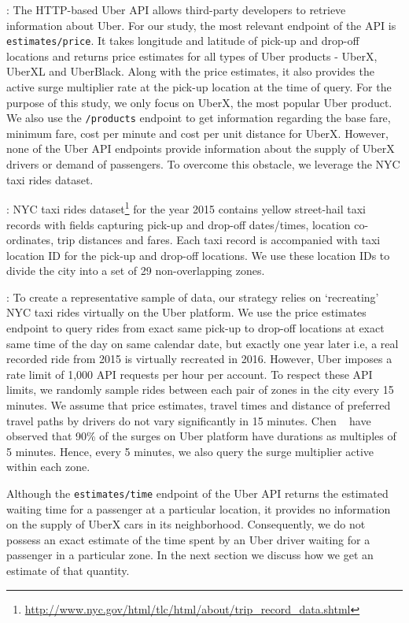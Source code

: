 : 
The HTTP-based Uber API allows third-party developers to retrieve information about Uber. For our study, the most relevant endpoint of the API is \texttt{estimates/price}. It takes longitude and latitude of pick-up and drop-off locations and returns price estimates for all types of Uber products - UberX, UberXL and UberBlack. Along with the price estimates, it also provides the active surge multiplier rate at the pick-up location at the time of query. For the purpose of this study, we only focus on UberX, the most popular Uber product. We also use the \texttt{/products} endpoint to get information regarding the base fare, minimum fare, cost per minute and cost per unit distance for UberX. However, none of the Uber API endpoints provide information about the supply of UberX drivers or demand of passengers. To overcome this obstacle, we leverage the NYC taxi rides dataset.

:
NYC taxi rides dataset\footnote{\url{http://www.nyc.gov/html/tlc/html/about/trip_record_data.shtml}} for the year 2015 contains yellow street-hail taxi records with fields capturing pick-up and drop-off dates/times, location co-ordinates, trip distances and fares. Each taxi record is accompanied with taxi location ID for the pick-up and drop-off locations. We use these location IDs to divide the city into a set of 29 non-overlapping zones.

:
To create a representative sample of data, our strategy relies on `recreating' NYC taxi rides virtually on the Uber platform. We use the price estimates endpoint to query rides from exact same pick-up to drop-off locations at exact same time of the day on same calendar date, but exactly one year later i.e, a real recorded ride from 2015 is virtually recreated in 2016. However, Uber imposes a rate limit of 1,000 API requests per hour per account. To respect these API limits, we randomly sample rides between each pair of zones in the city every 15 minutes. We assume that price estimates, travel times and distance of preferred travel paths by drivers do not vary significantly in 15 minutes. Chen {\etal}~\cite{chen2015peeking} have observed that 90\% of the surges on Uber platform have durations as multiples of 5 minutes. Hence, every 5 minutes, we also query the surge multiplier active within each zone.

Although the \texttt{estimates/time} endpoint of the Uber API returns the estimated waiting time for a passenger at a particular location, it provides no information on the supply of UberX cars in its neighborhood. Consequently, we do not possess an exact estimate of the time spent by an Uber driver waiting for a passenger in a particular zone. 
In the next section we discuss how we get an estimate of that quantity.
%

